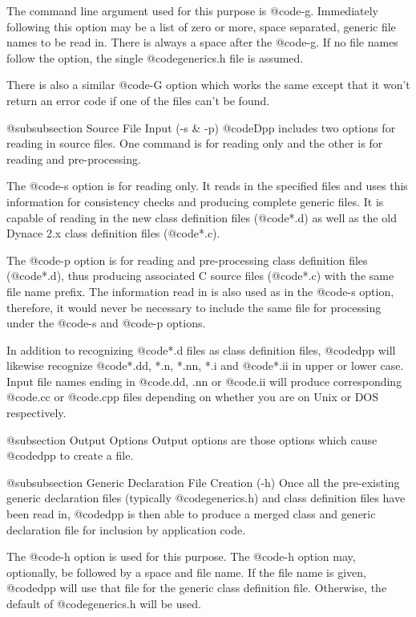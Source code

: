 The command line argument used for this purpose is @code{-g}.
Immediately following this option may be a list of zero or more,
space separated, generic file names to be read in.  There is always
a space after the @code{-g}.  If no file names follow the option,
the single @code{generics.h} file is assumed.

There is also a similar @code{-G} option which works the same except
that it won't return an error code if one of the files can't be
found.

@subsubsection Source File Input (-s & -p)
@code{Dpp} includes two options for reading in source files.  One
command is for reading only and the other is for reading and
pre-processing.

The @code{-s} option is for reading only.  It reads in the specified
files and uses this information for consistency checks and producing
complete generic files.  It is capable of reading in the new
class definition files (@code{*.d}) as well as the old Dynace 2.x
class definition files (@code{*.c}).

The @code{-p} option is for reading and pre-processing class
definition files (@code{*.d}), thus producing associated
C source files (@code{*.c}) with the same file name prefix.
The information read in is also used as in the @code{-s} option,
therefore, it would never be necessary to include the same
file for processing under the @code{-s} and @code{-p} options.

In addition to recognizing @code{*.d} files as class definition files,
@code{dpp} will likewise recognize @code{*.dd, *.n, *.nn, *.i} and
@code{*.ii} in upper or lower case.  Input file names ending in
@code{.dd, .nn} or @code{.ii} will produce corresponding @code{.cc} or
@code{.cpp} files depending on whether you are on Unix or DOS
respectively.

@subsection Output Options
Output options are those options which cause @code{dpp} to create
a file.

@subsubsection Generic Declaration File Creation (-h)
Once all the pre-existing generic declaration files (typically
@code{generics.h}) and class definition files have been read in,
@code{dpp} is then able to produce a merged class and generic
declaration file for inclusion by application code.

The @code{-h} option is used for this purpose.  The @code{-h} option
may, optionally, be followed by a space and file name.  If the file name
is given, @code{dpp} will use that file for the generic class definition
file.  Otherwise, the default of @code{generics.h} will be used.

